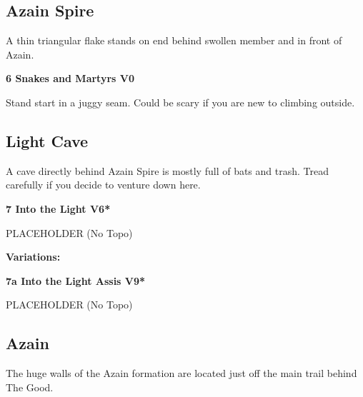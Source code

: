 \begin{multicols}{2}
\needspace{1.5cm}
\subsection*{Azain Spire}\label{bf:Azain Spire}
A thin triangular flake stands on end behind swollen member and in front of Azain.\\
	


\needspace{1.5cm}
\label{rt:Snakes and Martyrs}
\colorbox{green!20}{
\parbox{0.95\linewidth}{
\textbf{
6 Snakes and Martyrs V0  
}}}

\begin{adjustwidth}{0.5cm}{}			
 Stand start in a juggy seam. Could be scary if you are new to climbing outside.
\end{adjustwidth}




\needspace{1.5cm}
\subsection*{Light Cave}\label{bf:Light Cave}
A cave directly behind Azain Spire is mostly full of bats and trash. Tread carefully if you decide to venture down here.\\
	


\needspace{1.5cm}
\label{rt:Into the Light}
\colorbox{RoyalBlue!20}{
\parbox{0.95\linewidth}{
\textbf{
7 Into the Light V6*  
}}}

\begin{adjustwidth}{0.5cm}{}			
PLACEHOLDER (No Topo)
\end{adjustwidth}

\begin{adjustwidth}{0.5cm}{}				
\needspace{3cm}
\textbf{Variations:} \newline

\needspace{1.5cm}
\label{vr:Into the Light Assis}
\colorbox{Goldenrod!50}{
\parbox{0.95\linewidth}{
\textbf{
7a Into the Light Assis V9*  
}}}

\begin{adjustwidth}{0.5cm}{}			
PLACEHOLDER (No Topo)
\end{adjustwidth}


\end{adjustwidth}



\needspace{1.5cm}
\subsection*{Azain}\label{bf:Azain}
The huge walls of the Azain formation are located just off the main trail behind The Good.\\
	



\end{multicols}
